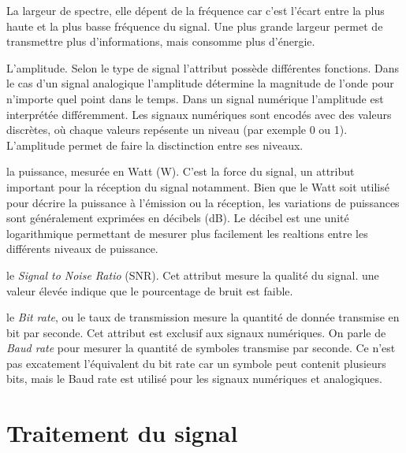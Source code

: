 \vspace{0.1cm}

La largeur de spectre, elle dépent de la fréquence car c'est l'écart entre la plus haute et la plus basse fréquence du signal. Une plus grande largeur permet de transmettre plus d'informations, mais consomme plus d'énergie.

\vspace{0.1cm}

L'amplitude. Selon le type de signal l'attribut possède différentes fonctions. Dans le cas d'un signal analogique l'amplitude détermine la magnitude de l'onde pour n'importe quel point dans le temps. Dans un signal numérique l'amplitude est interprétée différemment. Les signaux numériques sont encodés avec des valeurs discrètes, où chaque valeurs repésente un niveau (par exemple 0 ou 1). L'amplitude permet de faire la disctinction entre ses niveaux.

\vspace{0.1cm}

la puissance, mesurée en Watt (W). C'est la force du signal, un attribut important pour la réception du signal notamment. Bien que le Watt soit utilisé pour décrire la puissance à l'émission ou la réception, les variations de puissances sont généralement exprimées en décibels (dB). Le décibel est une unité logarithmique permettant de mesurer plus facilement les realtions entre les différents niveaux de puissance.

\vspace{0.1cm}

le \textit{Signal to Noise Ratio} (SNR). Cet attribut mesure la qualité du signal. une valeur élevée indique que le pourcentage de bruit est faible.

\vspace{0.1cm}

le \textit{Bit rate}, ou le taux de transmission mesure la quantité de donnée transmise en bit par seconde. Cet attribut est exclusif aux signaux numériques. On parle de \textit{Baud rate} pour mesurer la quantité de symboles transmise par seconde. Ce n'est pas excatement l'équivalent du bit rate car un symbole peut contenit plusieurs bits, mais le Baud rate est utilisé pour les signaux numériques et analogiques.



\section{Traitement du signal}

